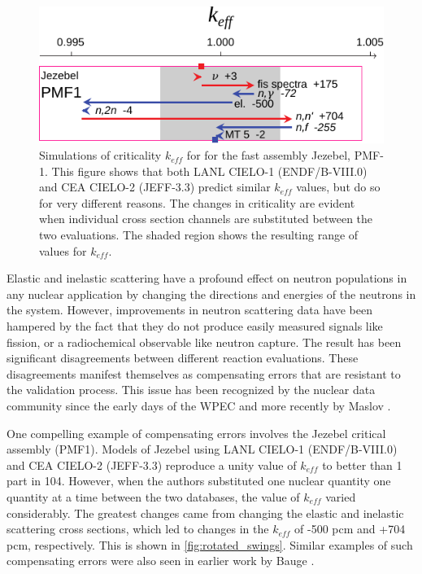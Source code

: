\documentclass[letterpaper]{ar-1col}
\begin{document}
\begin{figure}[b]
 \centering
 \includegraphics[width=0.7\linewidth]{rotated_swings.pdf}

 \caption{Simulations of criticality $k_{eff}$ for  for the fast assembly Jezebel, PMF-1.
This figure shows that both LANL CIELO-1 (ENDF/B-VIII.0) and CEA CIELO-2 (JEFF-3.3) predict similar $k_{eff}$ values, but do so for very different reasons.
The changes in criticality are evident when individual cross section channels are substituted between the two evaluations.
 The shaded region shows the  resulting range of values for $k_{eff}$.}
 \label{fig:rotated_swings}
\end{figure}


Elastic and inelastic scattering have a profound effect on neutron populations in any nuclear application by changing the directions and energies of the neutrons in the system.
 However, improvements in neutron scattering data have been hampered by the fact that they do not produce easily measured signals like fission, or a radiochemical observable like neutron capture.
 The result has been significant disagreements between different reaction evaluations.
 These disagreements manifest themselves as compensating errors that are resistant to the validation process.
 This issue has been recognized by the nuclear data community since the early days of the WPEC \cite{Row89} and more recently by Maslov \cite{Mas11}.
 
 
 

One compelling example of compensating errors involves the Jezebel  critical assembly (PMF1).
 Models of Jezebel using LANL CIELO-1 (ENDF/B-VIII.0) and CEA CIELO-2 (JEFF-3.3) reproduce a unity value of $k_{eff}$ to better than 1 part in 104.
 However, when the authors substituted one nuclear quantity one quantity at a time between the two databases, the value of $k_{eff}$ varied considerably.
 The greatest changes came from changing the elastic and inelastic scattering cross sections, which led to changes in the $k_{eff}$ of -500 pcm and +704 pcm, respectively.
This is shown in \autoref{fig:rotated_swings}.
  Similar examples of such compensating errors were also seen in earlier work by Bauge \cite{Bau12}.
 
\end{document}
